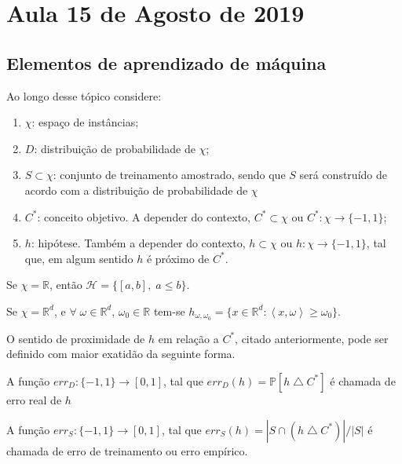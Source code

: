 
\section{Aula 15 de Agosto de 2019}
\label{2019_08_15}

\subsection{Elementos de aprendizado de máquina}
Ao longo desse tópico considere:
\begin{enumerate}
    \item $\chi$: espaço de instâncias;
    \item $D$: distribuição de probabilidade de $\chi$;
    \item $S \subset \chi$: conjunto de treinamento amostrado, sendo que $S$ será construído de acordo com a distribuição de probabilidade de $\chi$
    \item $C^*$: conceito objetivo. A depender do contexto, $C^* \subset \chi$ ou $C^*: \chi \rightarrow \{-1,1\}$;
    \item $h$: hipótese. Também a depender do contexto, $h \subset \chi$ ou $h: \chi \rightarrow \{-1,1\}$, tal que, em algum sentido $h$ é próximo de $C^*$.
\end{enumerate}{}

\begin{exemple}
Se $\chi = \mathbb{R}$, então $\mathcal{H} = \{[a,b],\;a\leq b\}$.
\end{exemple}{}

\begin{exemple}
Se $\chi = \mathbb{R}^d$,  e $\forall \; \omega \in \mathbb{R}^d$, $\omega_0 \in \mathbb{R}$ tem-se $h_{\omega, \omega_0} = \{x \in \mathbb{R}^d : \left< x, \omega\right> \geq \omega_0\}$.
\end{exemple}{}

O sentido de proximidade de $h$ em relação a $C^*$, citado anteriormente, pode ser definido com maior exatidão da seguinte forma.
\begin{definition}
A função $err_D: \{-1,1\}  \rightarrow [0,1]$, tal que $err_D(h) = \mathbb{P}[h \bigtriangleup C^*]$ é chamada de erro real de $h$
\end{definition}{}

\begin{definition}
A função $err_S: \{-1,1\}  \rightarrow [0,1]$, tal que $err_S(h) = | S \cap (h \bigtriangleup C^*)| / |S|$ é chamada de erro de treinamento ou erro empírico.
\end{definition}{}

